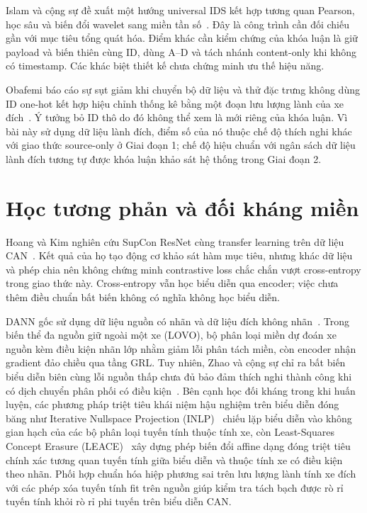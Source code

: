 \documentclass[12pt, a4paper, reqno, oneside]{book}
\begin{document}
Islam và cộng sự đề xuất một hướng universal IDS kết hợp tương quan Pearson, học sâu và biến đổi wavelet sang miền tần số~\cite{s26051489}. Đây là công trình cần đối chiếu gần với mục tiêu tổng quát hóa. Điểm khác cần kiểm chứng của khóa luận là giữ payload và biến thiên cùng ID, dùng A--D và tách nhánh content-only khi không có timestamp. Các khác biệt thiết kế chưa chứng minh ưu thế hiệu năng.

Obafemi báo cáo sự sụt giảm khi chuyển bộ dữ liệu và thử đặc trưng không dùng ID one-hot kết hợp hiệu chỉnh thống kê bằng một đoạn lưu lượng lành của xe đích~\cite{obafemi2026travel}. Ý tưởng bỏ ID thô do đó không thể xem là mới riêng của khóa luận. Vì bài này sử dụng dữ liệu lành đích, điểm số của nó thuộc chế độ thích nghi khác với giao thức source-only ở Giai đoạn 1; chế độ hiệu chuẩn với ngân sách dữ liệu lành đích tương tự được khóa luận khảo sát hệ thống trong Giai đoạn 2.

\section{Học tương phản và đối kháng miền}
Hoang và Kim nghiên cứu SupCon ResNet cùng transfer learning trên dữ liệu CAN~\cite{hoang2022supcon}. Kết quả của họ tạo động cơ khảo sát hàm mục tiêu, nhưng khác dữ liệu và phép chia nên không chứng minh contrastive loss chắc chắn vượt cross-entropy trong giao thức này. Cross-entropy vẫn học biểu diễn qua encoder; việc chưa thêm điều chuẩn bất biến không có nghĩa không học biểu diễn.

DANN gốc sử dụng dữ liệu nguồn có nhãn và dữ liệu đích không nhãn~\cite{ganin2016dann}. Trong biến thể đa nguồn giữ ngoài một xe (LOVO), bộ phân loại miền dự đoán xe nguồn kèm điều kiện nhãn lớp nhằm giảm lỗi phân tách miền, còn encoder nhận gradient đảo chiều qua tầng GRL. Tuy nhiên, Zhao và cộng sự chỉ ra bất biến biểu diễn biên cùng lỗi nguồn thấp chưa đủ bảo đảm thích nghi thành công khi có dịch chuyển phân phối có điều kiện~\cite{zhao2019invariant}. Bên cạnh học đối kháng trong khi huấn luyện, các phương pháp triệt tiêu khái niệm hậu nghiệm trên biểu diễn đóng băng như Iterative Nullspace Projection (INLP)~\cite{ravfogel2020null} chiếu lặp biểu diễn vào không gian hạch của các bộ phân loại tuyến tính thuộc tính xe, còn Least-Squares Concept Erasure (LEACE)~\cite{belrose2023leace} xây dựng phép biến đổi affine dạng đóng triệt tiêu chính xác tương quan tuyến tính giữa biểu diễn và thuộc tính xe có điều kiện theo nhãn. Phối hợp chuẩn hóa hiệp phương sai trên lưu lượng lành tính xe đích với các phép xóa tuyến tính fit trên nguồn giúp kiểm tra tách bạch được rò rỉ tuyến tính khỏi rò rỉ phi tuyến trên biểu diễn CAN.
\end{document}
